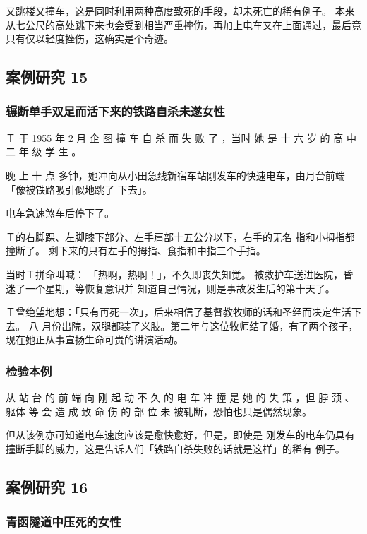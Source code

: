 \documentclass[UTF8]{ctexart}
\begin{document}
又跳楼又撞车，这是同时利用两种高度致死的手段，却未死亡的稀有例子。
本来从七公尺的高处跳下来也会受到相当严重摔伤，再加上电车又在上面通过，最后竟只有仅以轻度挫伤，这确实是个奇迹。


\subsection{案例研究 15}

\subsubsection*{辗断单手双足而活下来的铁路自杀未遂女性}

Ｔ 于 1955 年 2 月 企 图 撞 车 自 杀 而 失 败 了 ，当时 她 是 十 六 岁 的 高 中 二 年 级 学 生 。

晚 上 十 点 多钟，她冲向从小田急线新宿车站刚发车的快速电车，由月台前端「像被铁路吸引似地跳了 下去」。

电车急速煞车后停下了。

Ｔ的右脚踝、左脚膝下部分、左手肩部十五公分以下，右手的无名 指和小拇指都撞断了。
剩下来的只有左手的拇指、食指和中指三个手指。

当时Ｔ拼命叫喊： 「热啊，热啊！」，不久即丧失知觉。
被救护车送进医院，昏迷了一个星期，等恢复意识并 知道自己情况，则是事故发生后的第十天了。

Ｔ曾绝望地想：「只有再死一次」，后来相信了基督教牧师的话和圣经而决定生活下去。
八 月份出院，双腿都装了义肢。第二年与这位牧师结了婚，有了两个孩子，现在她正从事宣扬生命可贵的讲演活动。

\subsubsection*{检验本例}

从 站 台 的 前 端 向 刚 起 动 不 久 的 电 车 冲 撞 是 她 的 失 策 ，但 脖 颈 、躯体 等 会 造 成 致 命 伤 的 部 位 未 被轧断，恐怕也只是偶然现象。

但从该例亦可知道电车速度应该是愈快愈好，但是，即使是 刚发车的电车仍具有撞断手脚的威力，这是告诉人们「铁路自杀失败的话就是这样」的稀有 例子。

\subsection{案例研究 16}

\subsubsection*{青函隧道中压死的女性}
\end{document}
